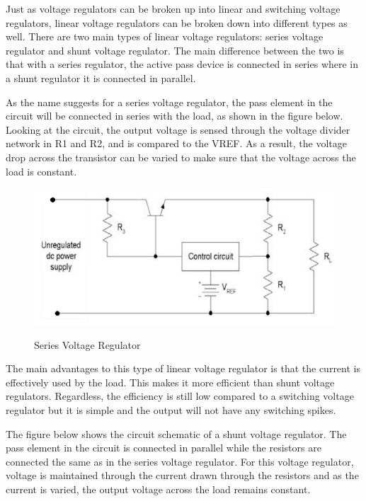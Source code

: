 Just as voltage regulators can be broken up into linear and switching voltage regulators, linear voltage regulators can be broken down into different types as well. There are two main types of linear voltage regulators: series voltage regulator and shunt voltage regulator. The main difference between the two is that with a series regulator, the active pass device is connected in series where in a shunt regulator it is connected in parallel. \par
As the name suggests for a series voltage regulator, the pass element in the circuit will be connected in series with the load, as shown in the figure below. Looking at the circuit, the output voltage is sensed through the voltage divider network in R1 and R2, and is compared to the VREF. As a result, the voltage drop across the transistor can be varied to make sure that the voltage across the load is constant. \par
\begin{figure}[H]
    \caption{Series Voltage Regulator}
    \centering
    \includegraphics[width=\textwidth]{images/Series_Voltage_Regulator.png}
    \label{fig:series-voltage-regulator}
\end{figure}
The main advantages to this type of linear voltage regulator is that the current is effectively used by the load. This makes it more efficient than shunt voltage regulators. Regardless, the efficiency is still low compared to a switching voltage regulator but it is simple and the output will not have any switching spikes.\par
The figure below shows the circuit schematic of a shunt voltage regulator. The pass element in the circuit is connected in parallel while the resistors are connected the same as in the series voltage regulator. For this voltage regulator, voltage is maintained through the current drawn through the resistors and as the current is varied, the output voltage across the load remains constant. \par
